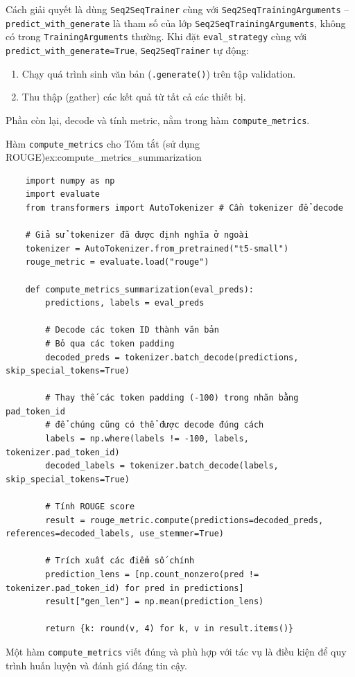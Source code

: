 Cách giải quyết là dùng \texttt{Seq2Seq\allowbreak Trainer} cùng với \texttt{Seq2Seq\allowbreak Training\allowbreak Arguments} -- \texttt{predict\_\allowbreak with\_\allowbreak generate} là tham số của lớp \texttt{Seq2Seq\allowbreak Training\allowbreak Arguments}, không có trong \texttt{Training\allowbreak Arguments} thường. Khi đặt \texttt{eval\_strategy} cùng với \texttt{predict\_\allowbreak with\_\allowbreak generate=True}, \texttt{Seq2Seq\allowbreak Trainer} tự động:
\begin{enumerate}
    \item Chạy quá trình sinh văn bản (\texttt{.generate()}) trên tập validation.
    \item Thu thập (gather) các kết quả từ tất cả các thiết bị.
\end{enumerate}
Phần còn lại, decode và tính metric, nằm trong hàm \texttt{compute\_metrics}.

\begin{example}{Hàm \texttt{compute\_metrics} cho Tóm tắt (sử dụng ROUGE)}{ex:compute_metrics_summarization}
    \begin{verbatim}
    import numpy as np
    import evaluate
    from transformers import AutoTokenizer # Cần tokenizer để decode

    # Giả sử tokenizer đã được định nghĩa ở ngoài
    tokenizer = AutoTokenizer.from_pretrained("t5-small")
    rouge_metric = evaluate.load("rouge")

    def compute_metrics_summarization(eval_preds):
        predictions, labels = eval_preds

        # Decode các token ID thành văn bản
        # Bỏ qua các token padding
        decoded_preds = tokenizer.batch_decode(predictions, skip_special_tokens=True)
        
        # Thay thế các token padding (-100) trong nhãn bằng pad_token_id
        # để chúng cũng có thể được decode đúng cách
        labels = np.where(labels != -100, labels, tokenizer.pad_token_id)
        decoded_labels = tokenizer.batch_decode(labels, skip_special_tokens=True)

        # Tính ROUGE score
        result = rouge_metric.compute(predictions=decoded_preds, references=decoded_labels, use_stemmer=True)

        # Trích xuất các điểm số chính
        prediction_lens = [np.count_nonzero(pred != tokenizer.pad_token_id) for pred in predictions]
        result["gen_len"] = np.mean(prediction_lens)
        
        return {k: round(v, 4) for k, v in result.items()}
    \end{verbatim}
\end{example}

Một hàm \texttt{compute\_metrics} viết đúng và phù hợp với tác vụ là điều kiện để quy trình huấn luyện và đánh giá đáng tin cậy.